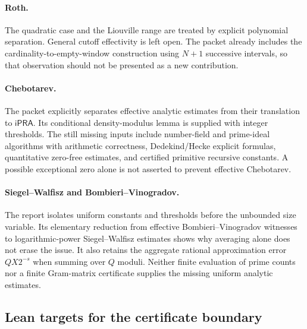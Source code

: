 \paragraph{Roth.}
The quadratic case and the Liouville range are treated by explicit
polynomial separation. General cutoff effectivity is left open. The
packet already includes the cardinality-to-empty-window construction
using $N+1$ successive intervals, so that observation should not be
presented as a new contribution.

\paragraph{Chebotarev.}
The packet explicitly separates effective analytic estimates from their
translation to $\mathsf{iPRA}$. Its conditional density-modulus lemma
is supplied with integer thresholds. The still missing inputs include
number-field and prime-ideal algorithms with arithmetic correctness,
Dedekind/Hecke explicit formulas, quantitative zero-free estimates,
and certified primitive recursive constants. A possible exceptional
zero alone is not asserted to prevent effective Chebotarev.

\paragraph{Siegel--Walfisz and Bombieri--Vinogradov.}
The report isolates uniform constants and thresholds before the
unbounded size variable. Its elementary reduction from effective
Bombieri--Vinogradov witnesses to logarithmic-power Siegel--Walfisz
estimates shows why averaging alone does not erase the issue. It also
retains the aggregate rational approximation error $QX2^{-s}$ when
summing over $Q$ moduli. Neither finite evaluation of prime counts nor
a finite Gram-matrix certificate supplies the missing uniform analytic
estimates.

\subsection{Lean targets for the certificate boundary}


